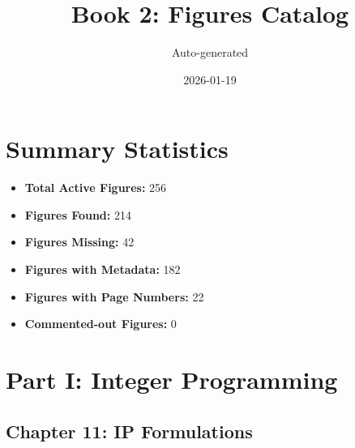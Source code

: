 \documentclass[11pt]{article}
\title{Book 2: Figures Catalog}
\author{Auto-generated}
\date{2026-01-19}
\begin{document}
\maketitle

\tableofcontents
\newpage



\section{Summary Statistics}
\begin{itemize}
    \item \textbf{Total Active Figures:} 256
    \item \textbf{Figures Found:} \textcolor{found}{214}
    \item \textbf{Figures Missing:} \textcolor{missing}{42}
    \item \textbf{Figures with Metadata:} 182
    \item \textbf{Figures with Page Numbers:} 22
    \item \textbf{Commented-out Figures:} 0
\end{itemize}
\newpage


\section{Part I: Integer Programming}


\subsection{Chapter 11: IP Formulations}
\end{document}
